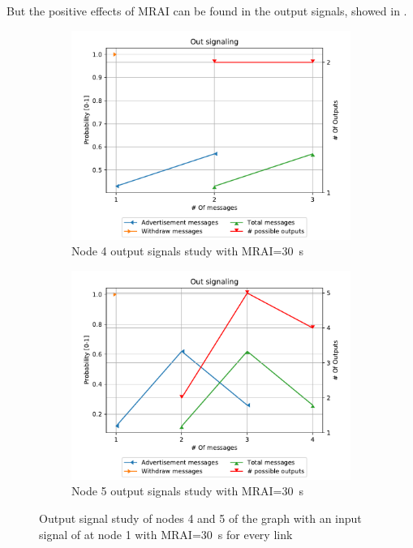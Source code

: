 But the positive effects of \ac{MRAI} can be found in the output signals,
showed in .

\begin{figure}[h]
     \centering
     \begin{subfigure}[b]{0.49\textwidth}
         \centering
         \includegraphics[width=\textwidth]{images/signal_study/fig_4_MRAI/fig_4_4_signaling_nmessage_prob.pdf}
		 \caption{Node \num{4} output signals study with \ac{MRAI}=\SI{30}{\second}}
         \label{fig:signal_node4_MRAI}
     \end{subfigure}
     \hfill
     \begin{subfigure}[b]{0.49\textwidth}
         \centering
         \includegraphics[width=\textwidth]{images/signal_study/fig_4_MRAI/fig_4_5_signaling_nmessage_prob.pdf}
		 \caption{Node \num{5} output signals study with \ac{MRAI}=\SI{30}{\second}}
         \label{fig:signal_node5_MRAI}
     \end{subfigure}
		\caption{Output signal study of nodes \num{4} and \num{5} of the graph
			 with an input signal of  at node \num{1}
			with \ac{MRAI}=\SI{30}{\second} for every link}
        \label{fig:signal_griffin_fig4_MRAI}
\end{figure}

